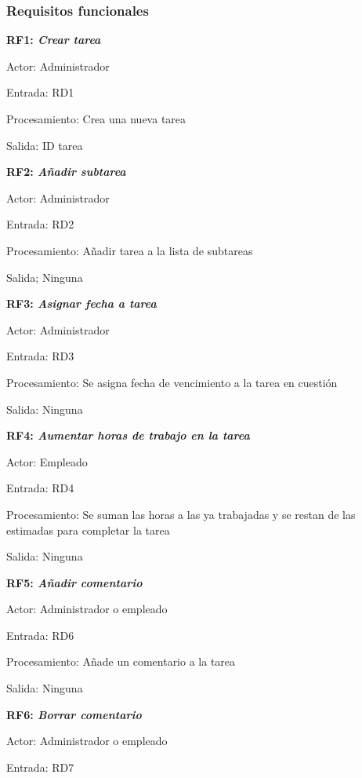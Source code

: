 \documentclass[paper=a4, fontsize=11pt, spanish]{scrartcl}
\begin{document}
	\subsubsection{Requisitos funcionales}
	\setlength{\parindent}{0em}
	\textbf{RF1: \textit{Crear tarea}}
	\setlength{\parindent}{2em}
	
	Actor: Administrador
	
	Entrada: RD1
	
	Procesamiento: Crea una nueva tarea
	
	Salida: ID tarea
	
	\setlength{\parindent}{0em}
	\textbf{RF2: \textit{Añadir subtarea}}
	\setlength{\parindent}{2em}
	
	Actor: Administrador
	
	Entrada: RD2
	
	Procesamiento: Añadir tarea a la lista de subtareas
	
	Salida; Ninguna
	
	\setlength{\parindent}{0em}
	\textbf{RF3: \textit{Asignar fecha a tarea}}
	\setlength{\parindent}{2em}
	
	Actor: Administrador
	
	Entrada: RD3
	
	Procesamiento: Se asigna fecha de vencimiento a la tarea en cuestión
	
	Salida: Ninguna
	
	\setlength{\parindent}{0em}
	\textbf{RF4: \textit{Aumentar horas de trabajo en la tarea}}
	\setlength{\parindent}{2em}
	
	Actor: Empleado
	
	Entrada: RD4
	
	Procesamiento: Se suman las horas a las ya trabajadas y se restan de las estimadas para completar la tarea
	
	Salida: Ninguna
	
	\setlength{\parindent}{0em}
	\textbf{RF5: \textit{Añadir comentario}}
	\setlength{\parindent}{2em}
	
	Actor: Administrador o empleado
	
	Entrada: RD6
	
	Procesamiento: Añade un comentario a la tarea
	
	Salida: Ninguna
	
	\setlength{\parindent}{0em}
	\textbf{RF6: \textit{Borrar comentario}}
	\setlength{\parindent}{2em}
	
	Actor: Administrador o empleado
	
	Entrada: RD7
	
\end{document}
